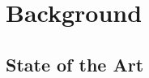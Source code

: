 \chapter{Background}
\label{chap:background}
\vspace{0.5cm}

\section{State of the Art}
\label{sec:state_of_the_art}



